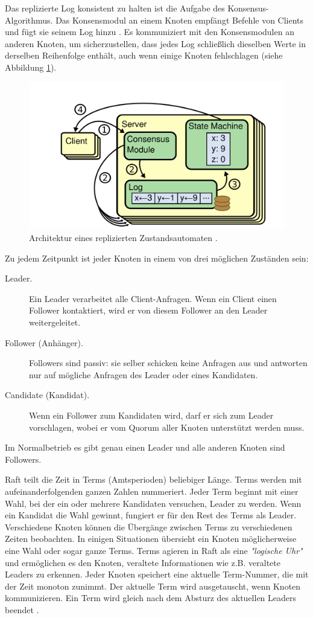 Das replizierte Log konsistent zu halten ist die Aufgabe des Konsensus-Algorithmus. Das Konsensmodul an einem Knoten empfängt Befehle von Clients und fügt sie seinem Log hinzu \cite{Ongaro14insearch}. Es kommuniziert mit den Konsensmodulen an anderen Knoten, um sicherzustellen, dass jedes Log schließlich dieselben Werte in derselben Reihenfolge enthält, auch wenn einige Knoten fehlschlagen (siehe Abbildung \ref{fig:rsm}).

\begin{figure}
	\centering
	\includegraphics[width=0.7\linewidth]{images/1_replicated_state_machine}
	\caption{Architektur eines replizierten Zustandsautomaten \cite{Ongaro14insearch}.}
	\label{fig:rsm}
\end{figure}

Zu jedem Zeitpunkt ist jeder Knoten in einem von drei möglichen Zuständen sein:

\begin{description} 
	\item[Leader.] Ein Leader verarbeitet alle Client-Anfragen. Wenn ein Client einen Follower kontaktiert, wird er von diesem Follower an den Leader weitergeleitet.
	
	\item[Follower (Anhänger).] Followers sind passiv: sie selber schicken keine Anfragen aus und antworten nur auf mögliche Anfragen des Leader oder eines Kandidaten.
	
	\item[Candidate (Kandidat).] Wenn ein Follower zum Kandidaten wird, darf er sich zum Leader vorschlagen, wobei er vom Quorum aller Knoten unterstützt werden muss.
\end{description}

Im Normalbetrieb es gibt genau einen Leader und alle anderen Knoten sind Followers.

Raft teilt die Zeit in Terms (Amtsperioden) beliebiger Länge. Terms werden mit aufeinanderfolgenden ganzen Zahlen nummeriert. Jeder Term beginnt mit einer Wahl, bei der ein oder mehrere Kandidaten versuchen, Leader zu werden. Wenn ein Kandidat die Wahl gewinnt, fungiert er für den Rest des Terms als Leader. Verschiedene Knoten können die Übergänge zwischen Terms zu verschiedenen Zeiten beobachten. In einigen Situationen übersieht ein Knoten möglicherweise eine Wahl oder sogar ganze Terms. Terms agieren in Raft als eine \textit{"logische Uhr"} und ermöglichen es den Knoten, veraltete Informationen wie z.B. veraltete Leaders zu erkennen. Jeder Knoten speichert eine aktuelle Term-Nummer, die mit der Zeit monoton zunimmt. Der aktuelle Term wird ausgetauscht, wenn Knoten kommunizieren. Ein Term wird gleich nach dem Absturz des aktuellen Leaders beendet \cite{Ongaro14insearch}.

